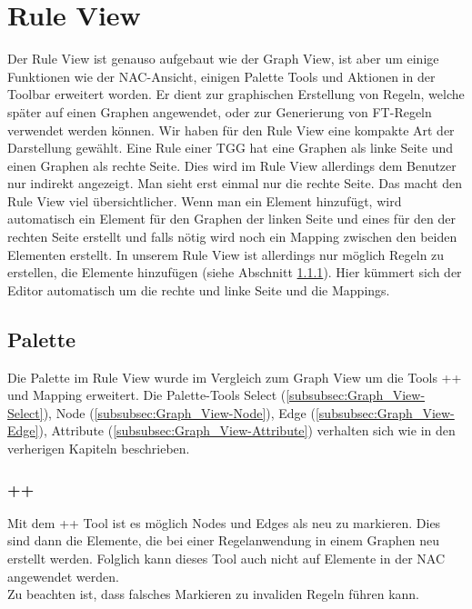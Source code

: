 \section{Rule View}\label{sec:ruleview}
Der Rule View ist genauso aufgebaut wie der Graph View, ist aber um einige Funktionen wie der NAC-Ansicht, einigen Palette Tools und Aktionen in der Toolbar erweitert worden. Er dient zur graphischen Erstellung von Regeln, welche später auf einen Graphen angewendet, oder zur Generierung von FT-Regeln verwendet werden können. Wir haben für den Rule View eine kompakte Art der Darstellung gewählt. Eine Rule einer TGG hat eine Graphen als linke Seite und einen Graphen als rechte Seite. Dies wird im Rule View allerdings dem Benutzer nur indirekt angezeigt. Man sieht erst einmal nur die rechte Seite. Das macht den Rule View viel übersichtlicher. Wenn man ein Element hinzufügt, wird automatisch ein Element für den Graphen der linken Seite und eines für den der rechten Seite erstellt und falls nötig wird noch ein Mapping zwischen den beiden Elementen erstellt. In unserem Rule View ist allerdings nur möglich Regeln zu erstellen, die Elemente hinzufügen (siehe Abschnitt \ref{subsubsec:Rule_View-++}). Hier kümmert sich der Editor automatisch um die rechte und linke Seite und die Mappings.

\subsection{Palette}
Die Palette im Rule View wurde im Vergleich zum Graph View um die Tools ++ und Mapping erweitert. Die Palette-Tools Select (\ref{subsubsec:Graph_View-Select}), Node (\ref{subsubsec:Graph_View-Node}), Edge (\ref{subsubsec:Graph_View-Edge}), Attribute (\ref{subsubsec:Graph_View-Attribute}) verhalten sich wie in den verherigen Kapiteln beschrieben.

\subsubsection{++}
\label{subsubsec:Rule_View-++}
Mit dem ++ Tool ist es möglich Nodes und Edges als neu zu markieren. Dies sind dann die Elemente, die bei einer Regelanwendung in einem Graphen neu erstellt werden. Folglich kann dieses Tool auch nicht auf Elemente in der NAC angewendet werden. \\
Zu beachten ist, dass falsches Markieren zu invaliden Regeln führen kann.

